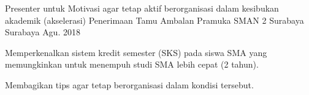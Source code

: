 

\begin{cventries}

  \cventry
    {Presenter untuk Motivasi agar tetap aktif berorganisasi dalam kesibukan akademik (akselerasi)} %
    {Penerimaan Tamu Ambalan Pramuka SMAN 2 Surabaya} %
    {Surabaya} %
    {Agu. 2018} %
    {
      \begin{cvitems} %
        \item {Memperkenalkan sistem kredit semester (SKS) pada siswa SMA yang memungkinkan untuk menempuh studi SMA lebih cepat (2 tahun).}
        \item {Membagikan tips agar tetap berorganisasi dalam kondisi tersebut.}
      \end{cvitems}
    }


\end{cventries}
